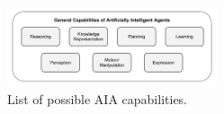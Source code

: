 %
%

	\begin{figure}[htbp]
    	\centering
     	\includegraphics[width=0.55\textwidth]{Figures/AI_capabilities}
    	\caption{List of possible AIA capabilities.} %
        \label{fig:AIcapabilities}
    \end{figure}

